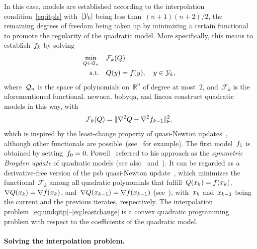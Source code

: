 \documentclass[
    smallextended,  %
    final,          %
]{svjour3}
\newcommand{\R}{\mathbb{R}}
\newcommand{\abs}[2][]{#1\lvert#2#1\rvert}
\newcommand{\frob}{\mathsf{F}}
\newcommand{\func}{\mathcal{F}}
\newcommand{\iter}[1][k]{x\ifthenelse{\equal{#1}{}}{}{_{#1}}}
\newcommand{\norm}[2][]{#1\lVert#2#1\rVert}
\newcommand{\objm}[1][k]{\obj\ifthenelse{\equal{#1}{}}{}{_{#1}}}
\newcommand{\obj}{f}
\newcommand{\qspace}[1][n]{\mathcal{Q}\ifthenelse{\equal{#1}{}}{}{_{#1}}}
\newcommand{\st}{\text{s.t.}}
\newcommand{\xpt}[1][k]{\mathcal{Y}\ifthenelse{\equal{#1}{}}{}{_{#1}}}
\begin{document}
In this case, models are established according to the interpolation condition~\eqref{eq:itpls}
with~$\abs{\xpt}$ being less than~$(n + 1)(n + 2) / 2$, the remaining degrees of freedom being taken up by minimizing a certain functional to promote the regularity of the quadratic model.
More specifically, this means to establish~$\objm$ by solving
\begin{equation}
    \label{eq:undqitp}
    \begin{split}
        \min_{Q \in \qspace}    & \quad \func_k(Q) \\
        \st                     & \quad Q(y) = \obj(y), \quad y \in \xpt,
    \end{split}
\end{equation}
where~$\qspace$ is the space of polynomials on~$\R^n$ of degree at most~$2$, and~$\func_k$ is the aforementioned functional.
\gls{newuoa}, \gls{bobyqa}, and \gls{lincoa} construct quadratic models in this way, with
\begin{equation}
    \label{eq:leastchange}
    \func_k(Q) = \norm{\nabla^2 Q - \nabla^2 \objm[k - 1]}_{\frob}^2,
\end{equation}
which is inspired by the least-change property of quasi-Newton updates~\cite{Dennis_Schnabel_1979}, although other functionals are possible~(see~\cite{Conn_Toint_1996,Bandeira_Scheinberg_Vicente_2012,Powell_2013,Zhang_2014} for example).
The first model~$\objm[1]$ is obtained by setting~$\objm[0] = 0$.
Powell~\cite{Powell_2013} referred to his approach as the \emph{symmetric Broyden update} of
quadratic models (see also~\cite[\S~3.6]{Zhang_2012} and~\cite[\S~2.4.2]{Ragonneau_2022}).
It can be regarded as a derivative-free version of the \gls{psb} quasi-Newton update~\cite{Powell_1970b}, which minimizes the functional~$\func_k$ among all quadratic polynomials that fulfill~$Q(\iter) = \obj(\iter)$, $\nabla Q(\iter) = \nabla \obj(\iter)$, and~$\nabla Q(\iter[k - 1]) = \nabla \obj(\iter[k - 1])$ (see~\cite[Theorem~4.2]{Dennis_Schnabel_1979}), with~$\iter$ and~$\iter[k - 1]$ being the current and the previous iterates, respectively.
The interpolation problem~\mbox{\eqref{eq:undqitp}--\eqref{eq:leastchange}} is a convex quadratic
programming problem with respect to the coefficients of the quadratic model.

\paragraph{\textnormal{\textbf{Solving the interpolation problem.}}}
\end{document}
